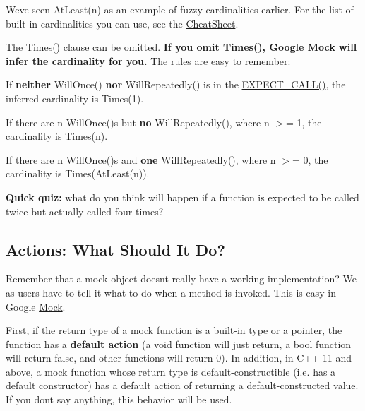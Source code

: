 We\textquotesingle{}ve seen {\ttfamily At\+Least(n)} as an example of fuzzy cardinalities earlier. For the list of built-\/in cardinalities you can use, see the \mbox{\hyperlink{_obj__test_2lib_2googletest-release-1_88_81_2googlemock_2docs_2_cheat_sheet_8md}{Cheat\+Sheet}}.

The {\ttfamily Times()} clause can be omitted. {\bfseries{If you omit {\ttfamily Times()}, Google \mbox{\hyperlink{class_mock}{Mock}} will infer the cardinality for you.}} The rules are easy to remember\+:


\begin{DoxyItemize}
\item If {\bfseries{neither}} {\ttfamily Will\+Once()} {\bfseries{nor}} {\ttfamily Will\+Repeatedly()} is in the {\ttfamily \mbox{\hyperlink{googletest-master_2googlemock_2include_2gmock_2gmock-spec-builders_8h_a535a6156de72c1a2e25a127e38ee5232}{E\+X\+P\+E\+C\+T\+\_\+\+C\+A\+L\+L()}}}, the inferred cardinality is {\ttfamily Times(1)}.
\item If there are {\ttfamily n Will\+Once()}\textquotesingle{}s but {\bfseries{no}} {\ttfamily Will\+Repeatedly()}, where {\ttfamily n} $>$= 1, the cardinality is {\ttfamily Times(n)}.
\item If there are {\ttfamily n Will\+Once()}\textquotesingle{}s and {\bfseries{one}} {\ttfamily Will\+Repeatedly()}, where {\ttfamily n} $>$= 0, the cardinality is {\ttfamily Times(\+At\+Least(n))}.
\end{DoxyItemize}

{\bfseries{Quick quiz\+:}} what do you think will happen if a function is expected to be called twice but actually called four times?

\subsection*{Actions\+: What Should It Do?}

Remember that a mock object doesn\textquotesingle{}t really have a working implementation? We as users have to tell it what to do when a method is invoked. This is easy in Google \mbox{\hyperlink{class_mock}{Mock}}.

First, if the return type of a mock function is a built-\/in type or a pointer, the function has a {\bfseries{default action}} (a {\ttfamily void} function will just return, a {\ttfamily bool} function will return {\ttfamily false}, and other functions will return 0). In addition, in C++ 11 and above, a mock function whose return type is default-\/constructible (i.\+e. has a default constructor) has a default action of returning a default-\/constructed value. If you don\textquotesingle{}t say anything, this behavior will be used.

